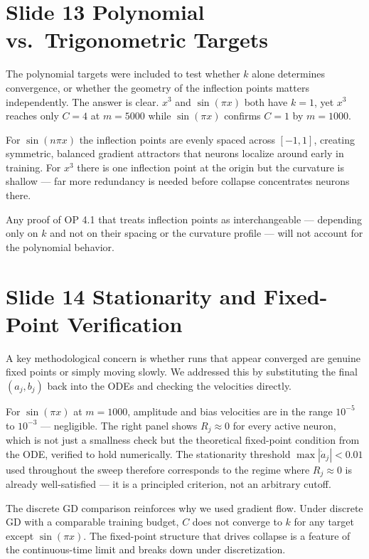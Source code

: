 \documentclass[11pt]{article}
\begin{document}
\section*{Slide 13 \quad Polynomial vs.\ Trigonometric Targets}

The polynomial targets were included to test whether $k$ alone determines convergence, or whether the geometry of the inflection points matters independently.
The answer is clear.
$x^3$ and $\sin(\pi x)$ both have $k = 1$, yet $x^3$ reaches only $C = 4$ at $m = 5000$ while $\sin(\pi x)$ confirms $C = 1$ by $m = 1000$.

For $\sin(n\pi x)$ the inflection points are evenly spaced across $[-1,1]$, creating symmetric, balanced gradient attractors that neurons localize around early in training.
For $x^3$ there is one inflection point at the origin but the curvature is shallow --- far more redundancy is needed before collapse concentrates neurons there.

Any proof of OP 4.1 that treats inflection points as interchangeable --- depending only on $k$ and not on their spacing or the curvature profile --- will not account for the polynomial behavior.

\section*{Slide 14 \quad Stationarity and Fixed-Point Verification}

A key methodological concern is whether runs that appear converged are genuine fixed points or simply moving slowly.
We addressed this by substituting the final $(a_j, b_j)$ back into the ODEs and checking the velocities directly.

For $\sin(\pi x)$ at $m = 1000$, amplitude and bias velocities are in the range $10^{-5}$ to $10^{-3}$ --- negligible.
The right panel shows $R_j \approx 0$ for every active neuron, which is not just a smallness check but the theoretical fixed-point condition from the ODE, verified to hold numerically.
The stationarity threshold $\max|\dot{a}_j| < 0.01$ used throughout the sweep therefore corresponds to the regime where $R_j \approx 0$ is already well-satisfied --- it is a principled criterion, not an arbitrary cutoff.

The discrete GD comparison reinforces why we used gradient flow.
Under discrete GD with a comparable training budget, $C$ does not converge to $k$ for any target except $\sin(\pi x)$.
The fixed-point structure that drives collapse is a feature of the continuous-time limit and breaks down under discretization.
\end{document}
